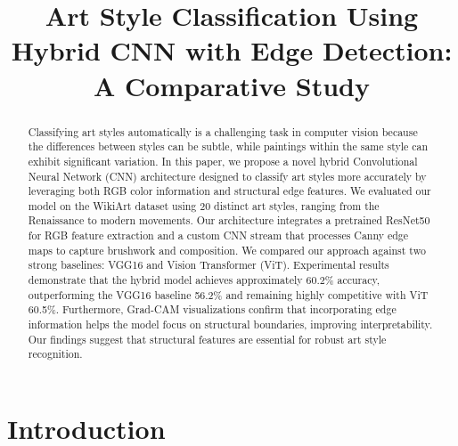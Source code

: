 \documentclass[conference]{IEEEtran}
\begin{document}
\title{Art Style Classification Using Hybrid CNN with Edge Detection: A Comparative Study}

\author{
\and
{}
}

\maketitle

\begin{abstract}
Classifying art styles automatically is a challenging task in computer vision because the differences between styles can be subtle, while paintings within the same style can exhibit significant variation. In this paper, we propose a novel hybrid Convolutional Neural Network (CNN) architecture designed to classify art styles more accurately by leveraging both RGB color information and structural edge features. We evaluated our model on the WikiArt dataset using 20 distinct art styles, ranging from the Renaissance to modern movements. Our architecture integrates a pretrained ResNet50 for RGB feature extraction and a custom CNN stream that processes Canny edge maps to capture brushwork and composition. We compared our approach against two strong baselines: VGG16 and Vision Transformer (ViT). Experimental results demonstrate that the hybrid model achieves approximately 60.2\% accuracy, outperforming the VGG16 baseline 56.2\% and remaining highly competitive with ViT 60.5\%. Furthermore, Grad-CAM visualizations confirm that incorporating edge information helps the model focus on structural boundaries, improving interpretability. Our findings suggest that structural features are essential for robust art style recognition.
\end{abstract}

\IEEEpeerreviewmaketitle

\section{Introduction}
\end{document}
